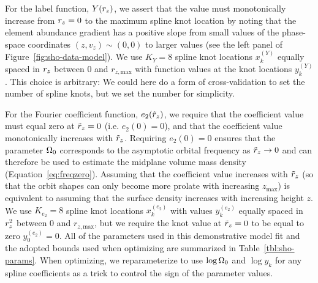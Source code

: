 For the label function, $Y(r_z)$, we assert that the value must monotonically increase
from $r_z = 0$ to the maximum spline knot location by noting that the element abundance
gradient has a positive slope from small values of the phase-space coordinates $(z,
v_z)\sim (0,0)$ to larger values (see the left panel of
Figure~\ref{fig:sho-data-model}).
We use $K_Y=8$ spline knot locations $x_k^{(Y)}$ equally spaced in $r_z$ between $0$
and $r_{z, \textrm{max}}$ with function values at the knot locations $y_k^{(Y)}$.
This choice is arbitrary: We could here do a form of cross-validation to set the number
of spline knots, but we set the number for simplicity.

For the Fourier coefficient function, $e_2(\tilde{r}_z)$, we require that the coefficient value
must equal zero at $\tilde{r}_z = 0$ (i.e. $e_2(0) = 0$), and that the coefficient value
monotonically increases with $\tilde{r}_z$.
Requiring $e_2(0) = 0$ ensures that the parameter $\Omega_0$ corresponds to the
asymptotic orbital frequency as $\tilde{r}_z \rightarrow 0$ and can therefore be used to
estimate the midplane volume mass density (Equation~\ref{eq:freqzero}).
Assuming that the coefficient value increases with $\tilde{r}_z$ (so that the orbit shapes
can only become more prolate with increasing $z_{\textrm{max}}$) is equivalent to
assuming that the surface density increases with increasing height $z$.
We use $K_{e_2}=8$ spline knot locations $x_k^{(e_2)}$ with values $y_k^{(e_2)}$ equally
spaced in $r_z^2$ between $0$ and $r_{z, \textrm{max}}$, but we require the knot value
at $\tilde{r}_z = 0$ to be equal to zero $y_0^{(e_2)}=0$.
All of the parameters used in this demonstrative model fit and the adopted bounds used
when optimizing are summarized in Table~\ref{tbl:sho-params}.
When optimizing, we reparameterize to use $\log \Omega_0$ and $\log y_k$ for any spline
coefficients as a trick to control the sign of the parameter values.

